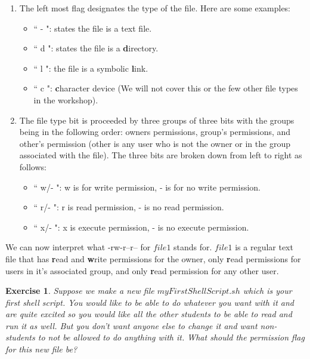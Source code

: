\documentclass[oneside]{book}
\newtheorem{ex}{Exercise}[chapter]
\begin{document}
\begin{enumerate}
    \item The left most flag designates the type of the file. Here are some examples:
        \begin{itemize}
            \item{`` - ":} states the file is a text file.
            \item{`` d ":} states the file is a \textbf{d}irectory.
            \item{`` l ":} the file is a symbolic \textbf{l}ink.
            \item{`` c ":} \textbf{c}haracter device (We will not cover this or the few other file types in the workshop).
        \end{itemize}
    \item The file type bit is proceeded by three groups of three bits with the groups being in the following order: owners permissions, group's permissions, and other's permission (other is any user who is not the owner or in the group associated with the file). The three bits are broken down from left to right as follows:
        \begin{itemize}
            \item{`` w/- ":} w is for write permission, - is for no write permission.
            \item{`` r/- ":} r is read permission, - is no read permission.
            \item{`` x/- ":} x is execute permission, - is no execute permission.
        \end{itemize}
\end{enumerate}
We can now interpret what -rw-r--r-- for $file1$ stands for. $file1$ is a regular text file that has \textbf{r}ead and \textbf{w}rite permissions for the owner, only \textbf{r}ead permissions for users in it's associated group, and only \textbf{r}ead permission for any other user.

\begin{ex}
    Suppose we make a new file $myFirstShellScript.sh$ which is your first shell script. You would like to be able to do whatever you want with it and are quite excited so you would like all the other students to be able to read and run it as well. But you don't want anyone else to change it and want non-students to not be allowed to do anything with it. What should the permission flag for this new file be? 
\end{ex}
\end{document}

